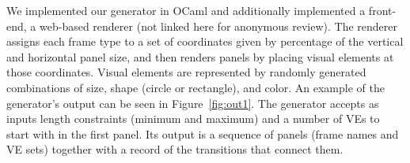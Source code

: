 
We implemented our generator in OCaml and additionally implemented a
front-end, a web-based renderer (not linked here for anonymous review). The
renderer assigns each frame type to a set of coordinates given by
percentage of the vertical and horizontal panel size, and then renders
panels by placing visual elements at those coordinates. Visual elements are
represented by randomly generated combinations of size, shape (circle or
rectangle), and color.  An example of the generator's output can be seen in
Figure~\ref{fig:out1}. 
The generator accepts as inputs length constraints (minimum and maximum)
and a number of VEs to start with in the first panel. Its output is a
sequence of panels (frame names and VE sets) together with a record of the
transitions that connect them.
% 



